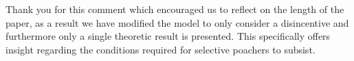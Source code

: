 \documentclass[10pt]{article}
\begin{document}
Thank you for this comment which encouraged us to reflect on the length of the
paper, as a result we have modified the model to only consider a disincentive
and furthermore only a single theoretic result is presented. This specifically
offers insight regarding the conditions required for selective poachers to
subsist.
\end{document}
